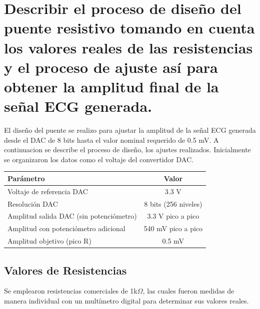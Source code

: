 \documentclass[a4paper,openany,12pt]{book}
\begin{document}
\maketitle

\tableofcontents 
\listoftables 
{}
\listoffigures 
{}

\setlength{\tabcolsep}{6pt} 
\renewcommand{\arraystretch}{1}
\clearpage
{}



\section{Describir el proceso de diseño del puente resistivo tomando en cuenta los valores reales
	de las resistencias y el proceso de ajuste así para obtener la amplitud final de la señal ECG
	generada.}

El diseño del puente se realizo  para ajustar la amplitud de la señal ECG generada desde el DAC de 8 bits  hasta el valor  nominal  requerido de 0.5 mV. A  continuacion  se describe  el proceso  de diseño, los ajustes  realizados. Inicialmente se organizaron los datos  como  el voltaje del convertidor DAC. 
\begin{table}[h]
	\centering
	\begin{tabular}{|l|c|}
		\hline
		\textbf{Parámetro} & \textbf{Valor} \\ \hline
		Voltaje de referencia DAC & 3.3 V \\ \hline
		Resolución DAC & 8 bits (256 niveles) \\ \hline
		Amplitud salida DAC (sin potenciómetro) & 3.3 V pico a pico \\ \hline
		Amplitud con potenciómetro adicional & 540 mV pico a pico \\ \hline
		Amplitud objetivo (pico R) & 0.5 mV \\ \hline
	\end{tabular}
\end{table}
\subsection{Valores de Resistencias}

Se emplearon resistencias comerciales de 1k$\Omega$, las cuales fueron medidas de manera individual con un multímetro digital para determinar sus valores reales.
\end{document}
